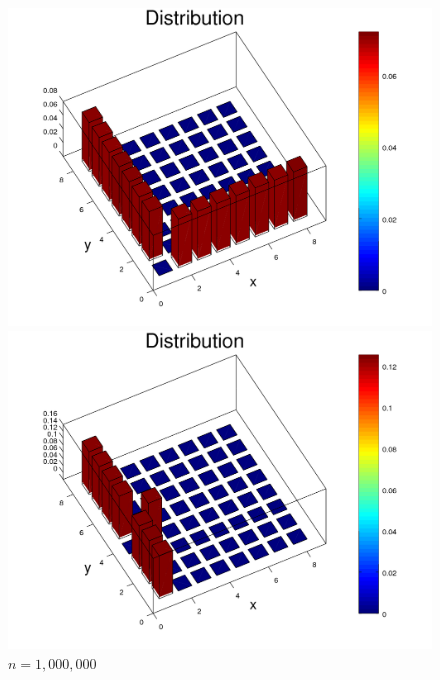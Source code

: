 \documentclass{amsart}
\numberwithin{equation}{section}
\begin{document}
\begin{figure}[!h]
    \centering
   \begin{minipage}{0.50\textwidth}
     \centering
     \includegraphics[width=1.0\linewidth]{figures/withHole/figure_Rook_moveFixedOrigin_N1000000_x1_y1.png}
     \captionsetup{labelformat=empty}
     \caption*{$n=1,000,000$}
   \end{minipage}\hfil
   \begin{minipage}{0.50\textwidth}
     \centering
     \includegraphics[width=1.0\linewidth]{figures/withHole/figure_Rook_moveFixedOrigin_N1000000_x1_y4.png}
     \captionsetup{labelformat=empty}
     \caption*{$n=1,000,000$}
   \end{minipage}\hfil

\end{figure}
\end{document}
